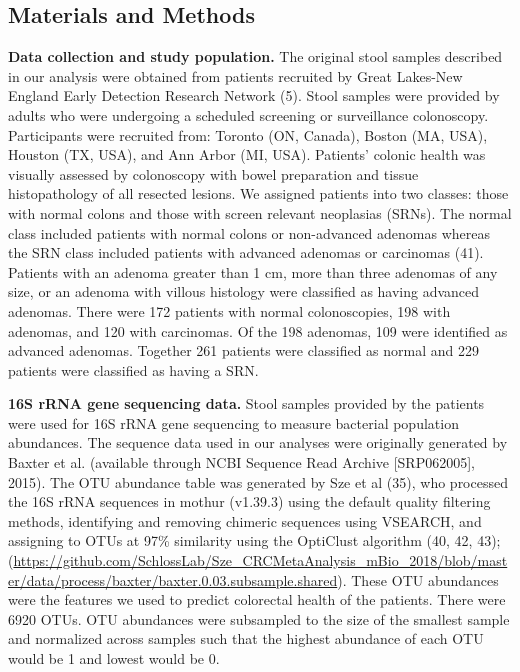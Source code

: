 \documentclass[11pt,]{article}
\begin{document}
\subsection{Materials and Methods}\label{materials-and-methods}

\textbf{Data collection and study population.} The original stool
samples described in our analysis were obtained from patients recruited
by Great Lakes-New England Early Detection Research Network (5). Stool
samples were provided by adults who were undergoing a scheduled
screening or surveillance colonoscopy. Participants were recruited from:
Toronto (ON, Canada), Boston (MA, USA), Houston (TX, USA), and Ann Arbor
(MI, USA). Patients' colonic health was visually assessed by colonoscopy
with bowel preparation and tissue histopathology of all resected
lesions. We assigned patients into two classes: those with normal colons
and those with screen relevant neoplasias (SRNs). The normal class
included patients with normal colons or non-advanced adenomas whereas
the SRN class included patients with advanced adenomas or carcinomas
(41). Patients with an adenoma greater than 1 cm, more than three
adenomas of any size, or an adenoma with villous histology were
classified as having advanced adenomas. There were 172 patients with
normal colonoscopies, 198 with adenomas, and 120 with carcinomas. Of the
198 adenomas, 109 were identified as advanced adenomas. Together 261
patients were classified as normal and 229 patients were classified as
having a SRN.

\textbf{16S rRNA gene sequencing data.} Stool samples provided by the
patients were used for 16S rRNA gene sequencing to measure bacterial
population abundances. The sequence data used in our analyses were
originally generated by Baxter et al. (available through NCBI Sequence
Read Archive {[}SRP062005{]}, 2015). The OTU abundance table was
generated by Sze et al (35), who processed the 16S rRNA sequences in
mothur (v1.39.3) using the default quality filtering methods,
identifying and removing chimeric sequences using VSEARCH, and assigning
to OTUs at 97\% similarity using the OptiClust algorithm (40, 42, 43);
(\url{https://github.com/SchlossLab/Sze_CRCMetaAnalysis_mBio_2018/blob/master/data/process/baxter/baxter.0.03.subsample.shared}).
These OTU abundances were the features we used to predict colorectal
health of the patients. There were 6920 OTUs. OTU abundances were
subsampled to the size of the smallest sample and normalized across
samples such that the highest abundance of each OTU would be 1 and
lowest would be 0.
\end{document}
